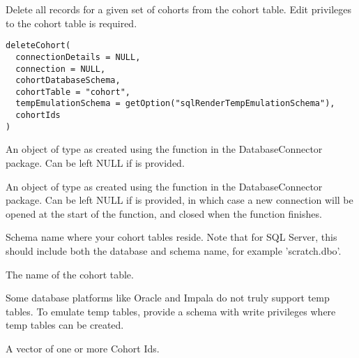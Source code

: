 \documentclass[a4paper]{book}
\begin{document}
%
\begin{Description}\relax
Delete all records for a given set of cohorts from the cohort table. Edit privileges
to the cohort table is required.

\strong{[Stable]}
\end{Description}
%
\begin{Usage}
\begin{verbatim}
deleteCohort(
  connectionDetails = NULL,
  connection = NULL,
  cohortDatabaseSchema,
  cohortTable = "cohort",
  tempEmulationSchema = getOption("sqlRenderTempEmulationSchema"),
  cohortIds
)
\end{verbatim}
\end{Usage}
%
\begin{Arguments}
\begin{ldescription}
\item[\code{connectionDetails}] An object of type  as created using the
 function in the
DatabaseConnector package. Can be left NULL if  is
provided.

\item[\code{connection}] An object of type  as created using the
 function in the
DatabaseConnector package. Can be left NULL if 
is provided, in which case a new connection will be opened at the start
of the function, and closed when the function finishes.

\item[\code{cohortDatabaseSchema}] Schema name where your cohort tables reside. Note that for SQL Server,
this should include both the database and schema name, for example
'scratch.dbo'.

\item[\code{cohortTable}] The name of the cohort table.

\item[\code{tempEmulationSchema}] Some database platforms like Oracle and Impala do not truly support
temp tables. To emulate temp tables, provide a schema with write
privileges where temp tables can be created.

\item[\code{cohortIds}] A vector of one or more Cohort Ids.
\end{ldescription}
\end{Arguments}
\end{document}
